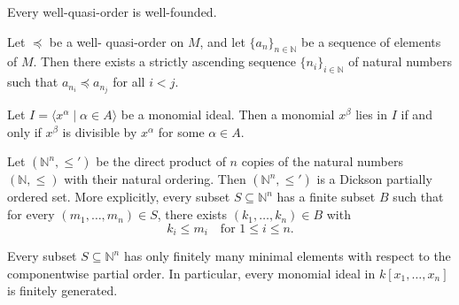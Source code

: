 \begin{corollary}\label{cor:wqo_is_wellFounded} %
    Every well-quasi-order is well-founded.
\end{corollary}
    
\begin{proposition}\label{prop:wqoAscendingSubsequence} %
    \leanok
    Let $\preceq$ be a well- quasi-order on $M$, and let $\{a_n\}_{n \in \mathbb{N}}$ be a sequence of elements of $M$.
    Then there exists a strictly ascending sequence $\{n_i\}_{i \in \mathbb{N}}$ of natural numbers such that $a_{n_i} \preceq a_{n_j}$ for all $i < j$.
\end{proposition}

\begin{lemma}\label{lem:mem_monomialIdeal_iff_divisible} %
    Let $I = \langle x^\alpha \mid \alpha \in A \rangle$ be a monomial ideal.
    Then a monomial $x^\beta$ lies in $I$ if and only if $x^\beta$ is divisible by $x^\alpha$ for some $\alpha \in A$.
\end{lemma}

\begin{theorem}\label{thm:Dickson} %
    Let $(\mathbb{N}^n, \le')$ be the direct product of $n$ copies of the natural numbers $(\mathbb{N}, \le)$ with their natural ordering. 
    Then $(\mathbb{N}^n, \le')$ is a Dickson partially ordered set. 
    More explicitly, every subset $S \subseteq \mathbb{N}^n$ has a finite subset $B$ such that for every $(m_1, \dots, m_n) \in S$, there exists $(k_1, \dots, k_n) \in B$ with
    \[
    k_i \le m_i \quad \text{for } 1 \le i \le n.
    \]
\end{theorem}

\begin{theorem}\label{thm:Dickson'}
    Every subset $S\subseteq \mathbb{N}^n$ has only finitely many minimal elements with respect to the componentwise partial order. 
    In particular, every monomial ideal in $k[x_1,\dots,x_n]$ is finitely generated.
\end{theorem}